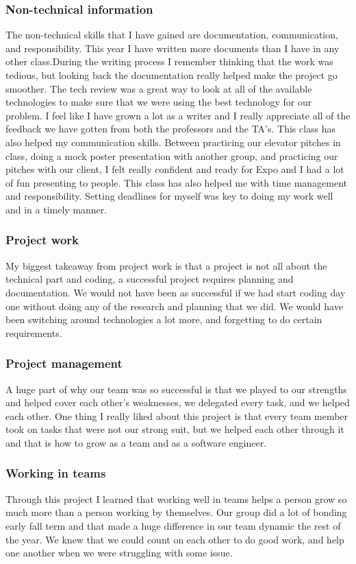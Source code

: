 \documentclass[onecolumn, draftclsnofoot,10pt, compsoc]{IEEEtran}
\begin{document}
\begin{flushleft}
\subsubsection{Non-technical information}
The non-technical skills that I have gained are documentation, communication, and responsibility. This year I have written more documents than I have in any other class.During the writing process I remember thinking that the work was tedious, but looking back the documentation really helped make the project go smoother. The tech review was a great way to look at all of the available technologies to make sure that we were using the best technology for our problem. I feel like I have grown a lot as a writer and I really appreciate all of the feedback we have gotten from both the professors and the TA's. 
This class has also helped my communication skills. Between practicing our elevator pitches in class, doing a mock poster presentation with another group, and practicing our pitches with our client, I felt really confident and ready for Expo and I had a lot of fun presenting to people. This class has also helped me with time management and responsibility. Setting deadlines for myself was key to doing my work well and in a timely manner.
\subsubsection{Project work}
My biggest takeaway from project work is that a project is not all about the technical part and coding, a successful project requires planning and documentation. We would not have been as successful if we had start coding day one without doing any of the research and planning that we did. We would have been switching around technologies a lot more, and forgetting to do certain requirements.  
\subsubsection{Project management}
A huge part of why our team was so successful is that we played to our strengths and helped cover each other's weaknesses, we delegated every task, and we helped each other. One thing I really liked about this project is that every team member took on tasks that were not our strong suit, but we helped each other through it and that is how to grow as a team and as a software engineer.
\subsubsection{Working in teams}
Through this project I learned that working well in teams helps a person grow so much more than a person working by themselves. Our group did a lot of bonding early fall term and that made a huge difference in our team dynamic the rest of the year. We knew that we could count on each other to do good work, and help one another when we were struggling with some issue. 

\end{flushleft}
\end{document}
